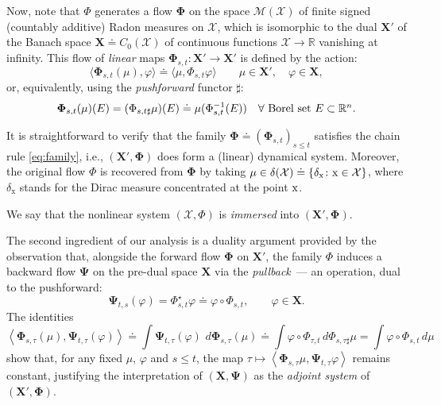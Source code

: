 \documentclass[sn-mathphys-num]{sn-jnl}
\numberwithin{equation}{section}
\theoremstyle{mythm}
\theoremstyle{mydef}
\renewcommand{\phi}{\varphi}
\renewcommand{\d}{\,d}
\newcommand{\R}{\mathbb{R}}
\begin{document}
Now, note that $\Phi$ generates a flow $\bm \Phi$ on the space $\mathcal{M}(\mathcal X)$ of finite signed (countably additive) Radon measures on \( \mathcal X \), which is isomorphic to the dual $\bm X'$ of the Banach space \(\bm X \doteq C_0(\mathcal X)\) of continuous functions \( \mathcal X \to \R \) vanishing at infinity. %
This flow of \emph{linear} maps $\bm \Phi_{s,t}\colon \bm X' \to \bm X'$ is defined by the action:
\begin{equation}\label{pushforward}
  \langle\bm{\Phi}_{s,t}(\mu), \phi\rangle \doteq \langle \mu, \Phi_{s,t}\phi\rangle \qquad \mu \in \bm X', \quad  \phi \in \bm X, %
\end{equation}
or, equivalently, using the \emph{pushforward} functor  \( \sharp \):
\[
  \bm{\Phi}_{s,t}(\mu)(E) = (\Phi_{s,t\sharp}\mu)(E) \doteq \mu(\Phi_{s,t}^{-1}(E))\quad \forall \mbox{  Borel set \( E \subset \mathbb{R}^n \)}.
\]

It is straightforward to verify that the family \( \bm{\Phi} \doteq (\bm \Phi_{s,t})_{s\leq t}\) satisfies the chain rule \eqref{eq:family}, i.e., \((\bm X', \bm{\Phi})\) does form a (linear) dynamical system. Moreover, the original flow \( \Phi \) is recovered from $\bm \Phi$ by taking \( \mu \in \delta(\mathcal X) \doteq \{\delta_{\mathrm x}\colon {\rm x} \in \mathcal X\} \), where \(\delta_{\mathrm{x}}\) stands for the Dirac measure concentrated at the point $\rm x$. 

We say that the nonlinear system \( (\mathcal X, \Phi) \) is \emph{immersed} into \( (\bm X', \bm \Phi) \).

\smallskip

The second ingredient of our analysis is a duality argument provided by the observation that, alongside the forward flow \( \bm \Phi \) on \( \bm X' \), the family \( \Phi \) induces a backward flow \( \bm \Psi \) on the pre-dual space \( \bm X \) via the \emph{pullback}~--- an operation, dual to the pushforward:
\begin{equation}
  \bm \Psi_{t,s}(\phi) = \Phi_{s,t}^\star \phi  \doteq  \phi\circ \Phi_{s,t}, \qquad \phi \in \bm X.\label{pull}
\end{equation}
The identities
\[
  \left<\bm\Phi_{s,\tau}(\mu), \bm \Psi_{t,\tau}(\phi)\right> \doteq \int \bm \Psi_{t,\tau}(\phi)\,\d \bm\Phi_{s,\tau}(\mu )\doteq \int \phi\circ \Phi_{\tau,t}\d \Phi_{s,\tau\sharp}\mu = \int \phi\circ\Phi_{s,t}\d \mu
\]
show that, for any fixed \( \mu \), \( \phi \) and \( s \le t\), the map \( \tau\mapsto  \left<\bm\Phi_{s,\tau}\mu, \bm \Psi_{t,\tau} \phi\right>\) remains constant, justifying the interpretation of  \((\bm X, \bm \Psi)\) as the \emph{adjoint system} of \((\bm X',\bm \Phi)\). 
\end{document}

